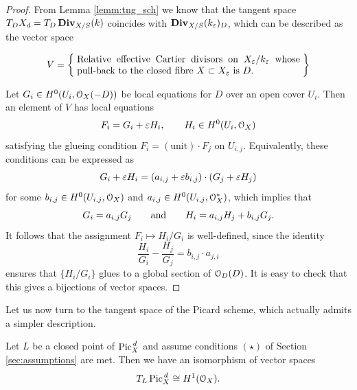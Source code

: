 	\begin{proof}
		From Lemma \ref{lemm:tng_sch} we know that the tangent space $T_D X_d = T_D\operatorname{\mathbf{Div}}_{X/S}(k)$ coincides with $ \operatorname{\mathbf{Div}}_{X/S}(k_\varepsilon)_D$, which can be described as the vector space
		
		$$ 
		V = \set{\parbox{8.2cm}{
		Relative effective Cartier divisors on $X_\eps / k_\eps$ 
		whose pull-back to the closed fibre $X\subset X_\eps$ is $D$.
		}}
		\vspace{0.5em}
		$$

		Let $G_i \in H^0(U_i,\mathcal{O}_X(-D)) $ be local equations for $D$ over an open cover $U_i$. Then an element of $V$ has local equations
		$$ F_i = G_i + \varepsilon H_i, \qquad H_i \in H^0(U_i,\mathcal{O}_X) $$
		satisfying the glueing condition $F_i = (\text{unit})\cdot F_j$ on $U_{i,j}$. Equivalently, these conditions can be expressed as
		$$ G_i + \varepsilon H_i = (a_{i,j} + \varepsilon b_{i,j})\cdot (G_j + \varepsilon H_j) $$
		for some $b_{i,j} \in H^0(U_{i,j},\mathcal{O}_X)$ and $ a_{i,j} \in H^0(U_{i,j},\mathcal{O}_X^*)$, which implies that
		$$ G_i = a_{i,j} G_j \qquad \text{and} \qquad H_i = a_{i,j} H_j + b_{i,j}G_j. $$
		It follows that the assignment $F_i \mapsto H_i/G_i$ is well-defined, since the identity
		$$ \frac{H_i}{G_i}-\frac{H_j}{G_j} = b_{i,j}\cdot a_{j,i} $$
		ensures that $\{H_i/G_i \} $ glues to a global section of $\mathcal{O}_D(D)$. It is easy to check that this gives a bijections of vector spaces.
	\end{proof}
	Let us now turn to the tangent space of the Picard scheme, which actually admits a simpler description.
	\begin{prop}\label{prop:tgn_pic}
		Let $L$ be a closed point of $ \operatorname{Pic}^{\,d}_X$ and assume conditions $(\star)$ of Section \ref{sec:assumptions} are met. Then we have an isomorphism of vector spaces
		$$ T_L \operatorname{Pic}^{\,d}_X \cong H^1(\mathcal{O}_X). $$
	\end{prop}

